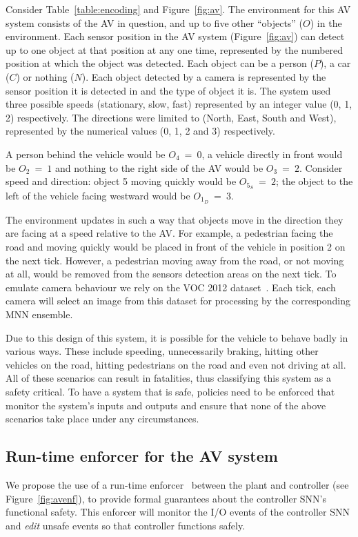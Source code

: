 Consider Table~\ref{table:encoding} and Figure~\ref{fig:av}.
The environment for this \ac{AV} system consists of the \ac{AV} in question, and up to five other ``objects'' ($O$) in the environment.
Each sensor position in the \ac{AV} system (Figure~\ref{fig:av}) can detect up to one object at that position at any one time, represented by the numbered position at which the object was detected.
Each object can be a person ($P$), a car ($C$) or nothing ($N$).
Each object detected by a camera is represented by the sensor position it is detected in and the type of object it is.
The system used three possible speeds (stationary, slow, fast) represented by an integer value (0, 1, 2) respectively.
The directions were limited to (North, East, South and West), represented by the numerical values (0, 1, 2 and 3) respectively.
\begin{example}
	A person behind the vehicle would be $O_{4}~=~0$, a vehicle directly in front would be $O_{2}~=~1$ and nothing to the right side of the \ac{AV} would be $O_{3}~=~2$.
	Consider speed and direction: object 5 moving quickly would be $O_{5_S}~=~2$; the object to the left of the vehicle facing westward would be $O_{1_D}~=~3$.
\end{example}

The environment updates in such a way that objects move in the direction they are facing at a speed relative to the \ac{AV}.
For example, a pedestrian facing the road and moving quickly would be placed in front of the vehicle in position 2 on the next tick.
However, a pedestrian moving away from the road, or not moving at all, would be removed from the sensors detection areas on the next tick.
To emulate camera behaviour we rely on the \ac{VOC} 2012 dataset~\cite{pascal-voc-2012}.
Each tick, each camera will select an image from this dataset for processing by the corresponding \ac{MNN} ensemble.

Due to this design of this system, it is possible for the vehicle to behave badly in various ways. 
These include speeding, unnecessarily braking, hitting other vehicles on the road, hitting pedestrians on the road and even not driving at all.
All of these scenarios can result in fatalities, thus classifying this system as a safety critical.
To have a system that is safe, policies need to be enforced that monitor the system's inputs and outputs and ensure that none of the above scenarios take place under any circumstances.

\subsection{Run-time enforcer for the \acf{AV} system}
We propose the use of a run-time enforcer~\cite{recps} between the plant and controller (see Figure~\ref{fig:avenf}), to provide formal guarantees about the controller \ac{SNN}'s functional safety.
This enforcer will monitor the I/O events of the controller \ac{SNN} and \textit{edit} unsafe events so that controller functions safely.

